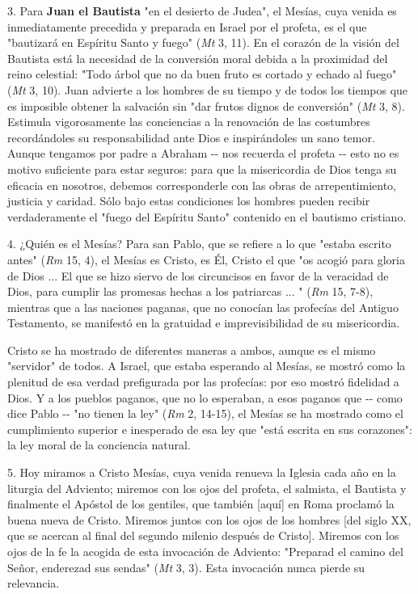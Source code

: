 3. Para \textbf{Juan el Bautista} "en el desierto de Judea", el Mesías,
cuya venida es inmediatamente precedida y preparada en Israel por el
profeta, es el que "bautizará en Espíritu Santo y fuego" (\emph{Mt} 3,
11). En el corazón de la visión del Bautista está la necesidad de la
conversión moral debida a la proximidad del reino celestial: "Todo árbol
que no da buen fruto es cortado y echado al fuego" (\emph{Mt} 3, 10).
Juan advierte a los hombres de su tiempo y de todos los tiempos que es
imposible obtener la salvación sin "dar frutos dignos de conversión"
(\emph{Mt} 3, 8). Estimula vigorosamente las conciencias a la renovación
de las costumbres recordándoles su responsabilidad ante Dios e
inspirándoles un sano temor. Aunque tengamos por padre a Abraham -\/-
nos recuerda el profeta -\/- esto no es motivo suficiente para estar
seguros: para que la misericordia de Dios tenga su eficacia en nosotros,
debemos corresponderle con las obras de arrepentimiento, justicia y
caridad. Sólo bajo estas condiciones los hombres pueden recibir
verdaderamente el "fuego del Espíritu Santo" contenido en el bautismo
cristiano.

4. ¿Quién es el Mesías? Para san Pablo, que se refiere a lo que "estaba
escrito antes" (\emph{Rm} 15, 4), el Mesías es Cristo, es Él, Cristo el
que "os acogió para gloria de Dios ... El que se hizo siervo de los
circuncisos en favor de la veracidad de Dios, para cumplir las promesas
hechas a los patriarcas ... " (\emph{Rm} 15, 7-8), mientras que a las
naciones paganas, que no conocían las profecías del Antiguo Testamento,
se manifestó en la gratuidad e imprevisibilidad de su misericordia.

Cristo se ha mostrado de diferentes maneras a ambos, aunque es el mismo
"servidor" de todos. A Israel, que estaba esperando al Mesías, se mostró
como la plenitud de esa verdad prefigurada por las profecías: por eso
mostró fidelidad a Dios. Y a los pueblos paganos, que no lo esperaban, a
esos paganos que -\/- como dice Pablo -\/- "no tienen la ley" (\emph{Rm}
2, 14-15), el Mesías se ha mostrado como el cumplimiento superior e
inesperado de esa ley que "está escrita en sus corazones": la ley moral
de la conciencia natural.

5. Hoy miramos a Cristo Mesías, cuya venida renueva la Iglesia cada año
en la liturgia del Adviento; miremos con los ojos del profeta, el
salmista, el Bautista y finalmente el Apóstol de los gentiles, que
también {[}aquí{]} en Roma proclamó la buena nueva de Cristo. Miremos
juntos con los ojos de los hombres {[}del siglo XX, que se acercan al
final del segundo milenio después de Cristo{]}. Miremos con los ojos de
la fe la acogida de esta invocación de Adviento: "Preparad el camino del
Señor, enderezad sus sendas" (\emph{Mt} 3, 3). Esta invocación nunca
pierde su relevancia.

